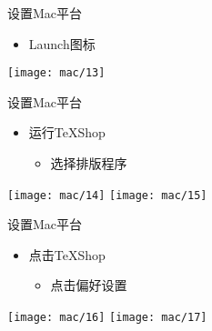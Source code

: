 \documentclass[fontset = none, t]{ctexbeamer}
\begin{document}
\begin{frame}{设置\tl}{Mac平台}
  \begin{itemize}
  \item Launch图标
  \end{itemize}
  \centering
  \vfill
  \texttt{[image: mac/13]}
  \vfill
\end{frame}

\begin{frame}{设置\tl}{Mac平台}
  \begin{itemize}
  \item 运行TeXShop
    \begin{itemize}
        \item 选择排版程序
     \end{itemize}
  \end{itemize}
  \begin{center}    
    \texttt{[image: mac/14]}
    \texttt{[image: mac/15]}
  \end{center}
\end{frame}

\begin{frame}{设置\tl}{Mac平台}
  \begin{itemize}
  \item 点击TeXShop
    \begin{itemize}
        \item 点击偏好设置
     \end{itemize}
  \end{itemize}
  \begin{center}    
    \texttt{[image: mac/16]}
    \texttt{[image: mac/17]}
  \end{center}
\end{frame}

\end{document}
